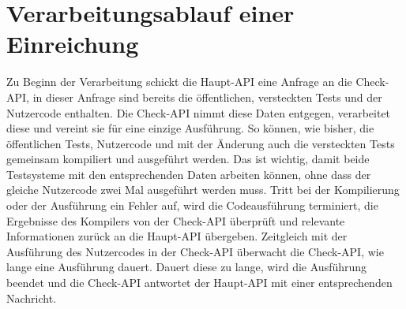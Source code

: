 \section{Verarbeitungsablauf einer Einreichung}
Zu Beginn der Verarbeitung schickt die Haupt-API eine Anfrage an die Check-API, in dieser Anfrage sind bereits die öffentlichen, versteckten Tests und der Nutzercode enthalten. Die Check-API nimmt diese Daten entgegen, verarbeitet diese und vereint sie für eine einzige Ausführung. So können, wie bisher, die öffentlichen Tests, Nutzercode und mit der Änderung auch die versteckten Tests gemeinsam kompiliert und ausgeführt werden. Das ist wichtig, damit beide Testsysteme mit den entsprechenden Daten arbeiten können, ohne dass der gleiche Nutzercode zwei Mal ausgeführt werden muss. Tritt bei der Kompilierung oder der Ausführung ein Fehler auf, wird die Codeausführung terminiert, die Ergebnisse des Kompilers von der Check-API überprüft und relevante Informationen zurück an die Haupt-API übergeben. Zeitgleich mit der Ausführung des Nutzercodes in der Check-API überwacht die Check-API, wie lange eine Ausführung dauert. Dauert diese zu lange, wird die Ausführung beendet und die Check-API antwortet der Haupt-API mit einer entsprechenden Nachricht.

